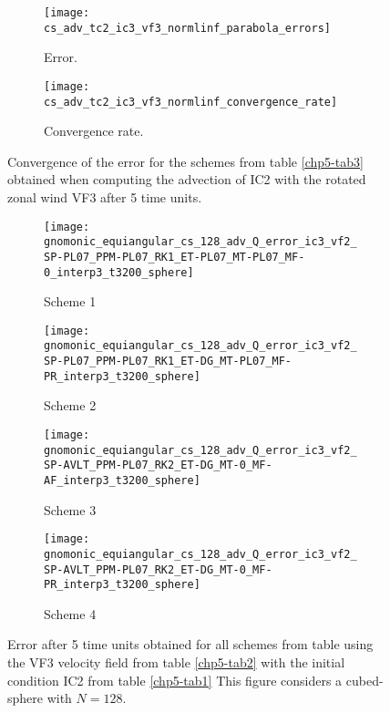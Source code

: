 \begin{figure}[!htb]
	\centering
	\begin{subfigure}{0.42\textwidth}
		\centering
		\texttt{[image: cs\_adv\_tc2\_ic3\_vf3\_normlinf\_parabola\_errors]}
		\caption{Error.\label{chp5-adv3-error}}
	\end{subfigure}
	\begin{subfigure}{0.42\textwidth}
		\centering
		\texttt{[image: cs\_adv\_tc2\_ic3\_vf3\_normlinf\_convergence\_rate]}
		\caption{Convergence rate.\label{chp5-adv3-cr}}
	\end{subfigure}
	\caption{Convergence of the error for the schemes from table \ref{chp5-tab3} obtained when computing the advection of IC2  with the rotated zonal wind VF3 after 5 time units.
		\label{chp5-error-adv3}}
\end{figure}


\begin{figure}[!htb]
	\centering
	\begin{subfigure}{0.35\textwidth}
		\centering
		\texttt{[image: gnomonic\_equiangular\_cs\_128\_adv\_Q\_error\_ic3\_vf2\_SP-PL07\_PPM-PL07\_RK1\_ET-PL07\_MT-PL07\_MF-0\_interp3\_t3200\_sphere]}
		\caption{Scheme 1 \label{chp5-adv3-s1}}
	\end{subfigure}
	\begin{subfigure}{0.35\textwidth}
		\centering
		\texttt{[image: gnomonic\_equiangular\_cs\_128\_adv\_Q\_error\_ic3\_vf2\_SP-PL07\_PPM-PL07\_RK1\_ET-DG\_MT-PL07\_MF-PR\_interp3\_t3200\_sphere]}
		\caption{Scheme 2 \label{chp5-adv3-s2}}
	\end{subfigure}
	
	\begin{subfigure}{0.35\textwidth}
		\centering
		\texttt{[image: gnomonic\_equiangular\_cs\_128\_adv\_Q\_error\_ic3\_vf2\_SP-AVLT\_PPM-PL07\_RK2\_ET-DG\_MT-0\_MF-AF\_interp3\_t3200\_sphere]}
		\caption{Scheme 3 \label{chp5-adv3-s3}}
	\end{subfigure}
	\begin{subfigure}{0.35\textwidth}
		\centering
		\texttt{[image: gnomonic\_equiangular\_cs\_128\_adv\_Q\_error\_ic3\_vf2\_SP-AVLT\_PPM-PL07\_RK2\_ET-DG\_MT-0\_MF-PR\_interp3\_t3200\_sphere]}
		\caption{Scheme 4 \label{chp5-adv3-s4}}
	\end{subfigure}
	\caption{ Error after 5 time units obtained for all schemes from table using the VF3 velocity field from table \ref{chp5-tab2} with the initial condition IC2 from  table \ref{chp5-tab1} 
		This figure considers a cubed-sphere with $N=128$. \label{chp5-adv3}}
\end{figure}

